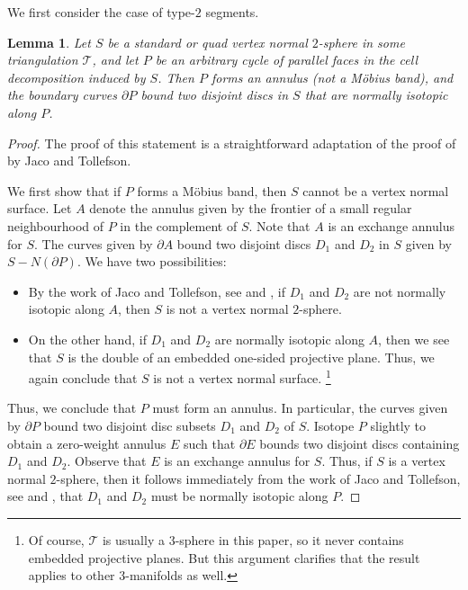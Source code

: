 \documentclass[10pt,a4paper]{amsart}
\newtheorem{lemma}[theorem]{Lemma}
\newcommand{\tri}{\mathcal{T}}
\begin{document}
We first consider the case of type-$2$ segments.

\begin{lemma}\label{lem:cycleParallel}
Let $S$ be a standard or quad vertex normal $2$-sphere in some triangulation $\tri$, and let $P$ be an arbitrary cycle of parallel faces in the cell decomposition induced by $S$. Then $P$ forms an annulus (not a M\"{o}bius band), and the boundary curves $\partial P$ bound two disjoint discs in $S$ that are normally isotopic along $P$.
\end{lemma}

\begin{proof}
The proof of this statement is a straightforward adaptation of the proof of \cite[Theorem 4.1]{jaco1995algorithms} by Jaco and Tollefson.

We first show that if $P$ forms a M\"{o}bius band, then $S$ cannot be a vertex normal surface.
Let $A$ denote the annulus given by the frontier of a small regular neighbourhood of $P$ in the complement of $S$. Note that $A$ is an exchange annulus for $S$.
The curves given by $\partial A$ bound two disjoint discs $D_1$ and $D_2$ in $S$ given by $S - N(\partial P)$.
We have two possibilities:
\begin{itemize}
\item By the work of Jaco and Tollefson, see \cite{jaco1995algorithms} and , if $D_1$ and $D_2$ are not normally isotopic along $A$, then $S$ is not a vertex normal $2$-sphere.
\item On the other hand, if $D_1$ and $D_2$ are normally isotopic along $A$, then we see that $S$ is the double of an embedded one-sided projective plane.
Thus, we again conclude that $S$ is not a vertex normal surface.%
\footnote{Of course, $\tri$ is usually a $3$-sphere in this paper, so it never contains embedded projective planes.
But this argument clarifies that the result applies to other $3$-manifolds as well.}
\end{itemize}

Thus, we conclude that $P$ must form an annulus.
In particular, the curves given by $\partial P$ bound two disjoint disc subsets $D_1$ and $D_2$ of $S$.
Isotope $P$ slightly to obtain a zero-weight annulus $E$ such that $\partial E$ bounds two disjoint discs containing $D_1$ and $D_2$.
Observe that $E$ is an exchange annulus for $S$.
Thus, if $S$ is a vertex normal $2$-sphere, then it follows immediately from the work of Jaco and Tollefson, see \cite{jaco1995algorithms} and , that $D_1$ and $D_2$ must be normally isotopic along $P$.
\end{proof}
\end{document}
